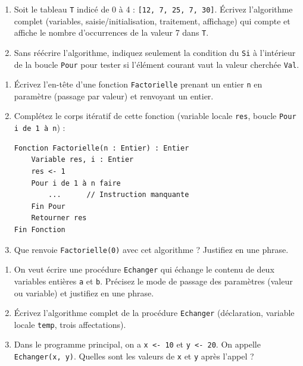 \documentclass[11pt]{article}
\begin{document}
\begin{exercice}
\begin{enumerate}
    \item Soit le tableau \texttt{T} indicé de 0 à 4 : \texttt{[12, 7, 25, 7, 30]}. Écrivez l'algorithme complet (variables, saisie/initialisation, traitement, affichage) qui compte et affiche le nombre d'occurrences de la valeur 7 dans \texttt{T}.
    \item Sans réécrire l'algorithme, indiquez seulement la condition du \texttt{Si} à l'intérieur de la boucle \texttt{Pour} pour tester si l'élément courant vaut la valeur cherchée \texttt{Val}.
\end{enumerate}
\end{exercice}

\begin{exercice}
\begin{enumerate}
    \item Écrivez l'en-tête d'une fonction \texttt{Factorielle} prenant un entier \texttt{n} en paramètre (passage par valeur) et renvoyant un entier.
    \item Complétez le corps itératif de cette fonction (variable locale \texttt{res}, boucle \texttt{Pour i de 1 à n}) :
\begin{verbatim}
Fonction Factorielle(n : Entier) : Entier
    Variable res, i : Entier
    res <- 1
    Pour i de 1 à n faire
        ...      // Instruction manquante
    Fin Pour
    Retourner res
Fin Fonction
\end{verbatim}
    \item Que renvoie \texttt{Factorielle(0)} avec cet algorithme ? Justifiez en une phrase.
\end{enumerate}
\end{exercice}

\begin{exercice}
\begin{enumerate}
    \item On veut écrire une procédure \texttt{Echanger} qui échange le contenu de deux variables entières \texttt{a} et \texttt{b}. Précisez le mode de passage des paramètres (valeur ou variable) et justifiez en une phrase.
    \item Écrivez l'algorithme complet de la procédure \texttt{Echanger} (déclaration, variable locale \texttt{temp}, trois affectations).
    \item Dans le programme principal, on a \texttt{x <- 10} et \texttt{y <- 20}. On appelle \texttt{Echanger(x, y)}. Quelles sont les valeurs de \texttt{x} et \texttt{y} après l'appel ?
\end{enumerate}
\end{exercice}
\end{document}
